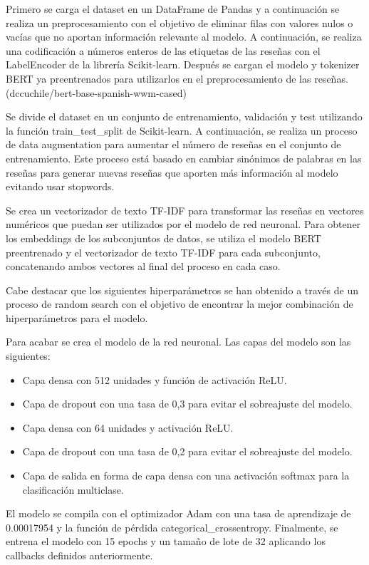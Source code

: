 Primero se carga el dataset en un DataFrame de Pandas y a continuación se realiza un preprocesamiento con el objetivo de eliminar filas con valores nulos o vacías que no aportan información relevante al modelo.
A continuación, se realiza una codificación a números enteros de las etiquetas de las reseñas con el LabelEncoder de la librería Scikit-learn.
Después se cargan el modelo y tokenizer BERT ya preentrenados para utilizarlos en el preprocesamiento de las reseñas. (dccuchile/bert-base-spanish-wwm-cased)

Se divide el dataset en un conjunto de entrenamiento, validación y test utilizando la función train\_test\_split de Scikit-learn.
A continuación, se realiza un proceso de data augmentation para aumentar el número de reseñas en el conjunto de entrenamiento.
Este proceso está basado en cambiar sinónimos de palabras en las reseñas para generar nuevas reseñas que aporten más información al modelo evitando usar stopwords.

Se crea un vectorizador de texto TF-IDF para transformar las reseñas en vectores numéricos que puedan ser utilizados por el modelo de red neuronal.
Para obtener los embeddings de los subconjuntos de datos, se utiliza el modelo BERT preentrenado y el vectorizador de texto TF-IDF para cada subconjunto, concatenando ambos vectores al final del proceso en cada caso.

Cabe destacar que los siguientes hiperparámetros se han obtenido a través de un proceso de random search con el objetivo de encontrar la mejor combinación de hiperparámetros para el modelo.

Para acabar se crea el modelo de la red neuronal. Las capas del modelo son las siguientes:
\begin{itemize}
    \item Capa densa con 512 unidades y función de activación ReLU.
    \item Capa de dropout con una tasa de 0,3 para evitar el sobreajuste del modelo.
    \item Capa densa con 64 unidades y activación ReLU.
    \item Capa de dropout con una tasa de 0,2 para evitar el sobreajuste del modelo.
    \item Capa de salida en forma de capa densa con una activación softmax para la clasificación multiclase.
\end{itemize}

El modelo se compila con el optimizador Adam con una tasa de aprendizaje de 0.00017954 y la función de pérdida categorical\_crossentropy.
Finalmente, se entrena el modelo con 15 epochs y un tamaño de lote de 32 aplicando los callbacks definidos anteriormente.

